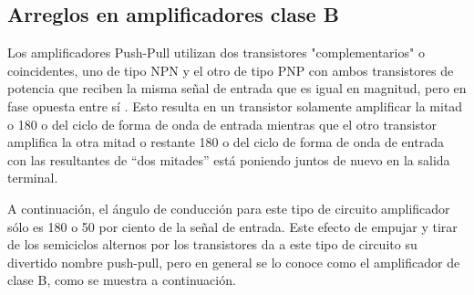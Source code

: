 \documentclass[12pt,a4paper]{article}
\begin{document}
\begin{flushleft}
\section {Arreglos en amplificadores clase B}
Los amplificadores Push-Pull utilizan dos transistores "complementarios" o coincidentes, uno de tipo NPN y el otro de tipo PNP con ambos transistores de potencia que reciben la misma señal de entrada que es igual en magnitud, pero en fase opuesta entre sí . Esto resulta en un transistor solamente amplificar la mitad o 180 o del ciclo de forma de onda de entrada mientras que el otro transistor amplifica la otra mitad o restante 180 o del ciclo de forma de onda de entrada con las resultantes de “dos mitades” está poniendo juntos de nuevo en la salida terminal.

A continuación, el ángulo de conducción para este tipo de circuito amplificador sólo es 180 o 50 por ciento de la señal de entrada. Este efecto de empujar y tirar de los semiciclos alternos por los transistores da a este tipo de circuito su divertido nombre push-pull, pero en general se lo conoce como el amplificador de clase B, como se muestra a continuación.
\linebreak
\end{flushleft}
\end{document}
